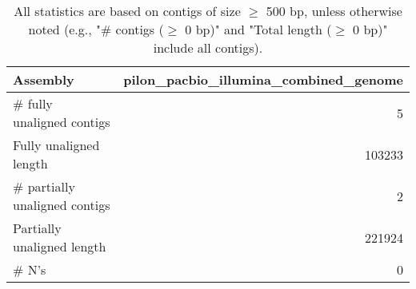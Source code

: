 \documentclass[12pt,a4paper]{article}
\begin{document}
\begin{table}[ht]
\begin{center}
\caption{All statistics are based on contigs of size $\geq$ 500 bp, unless otherwise noted (e.g., "\# contigs ($\geq$ 0 bp)" and "Total length ($\geq$ 0 bp)" include all contigs).}
\begin{tabular}{|l*{1}{|r}|}
\hline
Assembly & pilon\_pacbio\_illumina\_combined\_genome \\ \hline
\# fully unaligned contigs & 5 \\ \hline
Fully unaligned length & 103233 \\ \hline
\# partially unaligned contigs & 2 \\ \hline
Partially unaligned length & 221924 \\ \hline
\# N's & 0 \\ \hline
\end{tabular}
\end{center}
\end{table}
\end{document}

